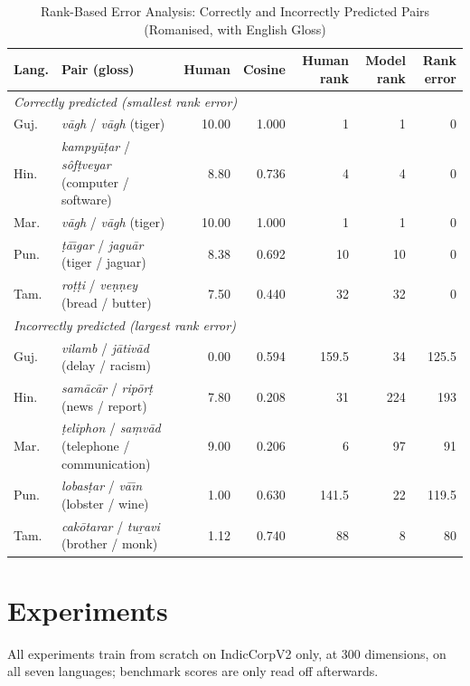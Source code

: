 \documentclass[conference,10pt]{IEEEtran}
\begin{document}
\begin{table}[!t]
\caption{Rank-Based Error Analysis: Correctly and Incorrectly Predicted Pairs (Romanised, with English Gloss)}
\label{tab:pairs}
\centering
\renewcommand{\arraystretch}{1.2}
\footnotesize
\begin{tabular}{|l|l|r|r|r|r|r|}
\hline
\rowcolor{srcblue!15}
\textbf{Lang.} & \textbf{Pair (gloss)} & \textbf{Human} & \textbf{Cosine} & \textbf{Human rank} & \textbf{Model rank} & \textbf{Rank error} \\
\hline
\multicolumn{7}{|l|}{\cellcolor{srcblue!6}\textit{Correctly predicted (smallest rank error)}} \\
\hline
Guj. & \textit{v\=agh} / \textit{v\=agh} (tiger) & 10.00 & 1.000 & 1 & 1 & 0 \\
\hline
Hin. & \textit{kampy\=u\d{t}ar} / \textit{s\^{o}f\d{t}veyar} (computer / software) & 8.80 & 0.736 & 4 & 4 & 0 \\
\hline
Mar. & \textit{v\=agh} / \textit{v\=agh} (tiger) & 10.00 & 1.000 & 1 & 1 & 0 \\
\hline
Pun. & \textit{\d{t}\=a\={\i}gar} / \textit{jagu\=ar} (tiger / jaguar) & 8.38 & 0.692 & 10 & 10 & 0 \\
\hline
Tam. & \textit{ro\d{t}\d{t}i} / \textit{ve\d{n}\d{n}ey} (bread / butter) & 7.50 & 0.440 & 32 & 32 & 0 \\
\hline
\multicolumn{7}{|l|}{\cellcolor{srcblue!6}\textit{Incorrectly predicted (largest rank error)}} \\
\hline
Guj. & \textit{vilamb} / \textit{j\=ativ\=ad} (delay / racism) & 0.00 & 0.594 & 159.5 & 34 & 125.5 \\
\hline
Hin. & \textit{sam\=ac\=ar} / \textit{rip\=or\d{t}} (news / report) & 7.80 & 0.208 & 31 & 224 & 193 \\
\hline
Mar. & \textit{\d{t}eliphon} / \textit{sa\d{m}v\=ad} (telephone / communication) & 9.00 & 0.206 & 6 & 97 & 91 \\
\hline
Pun. & \textit{lobas\d{t}ar} / \textit{v\=a\={\i}n} (lobster / wine) & 1.00 & 0.630 & 141.5 & 22 & 119.5 \\
\hline
Tam. & \textit{cak\=otarar} / \textit{tu\b{r}avi} (brother / monk) & 1.12 & 0.740 & 88 & 8 & 80 \\
\hline
\end{tabular}
\end{table}

\section{Experiments}\label{sec:experiments}
All experiments train from scratch on IndicCorpV2 only, at 300 dimensions, on all seven languages; benchmark scores are only read off afterwards.
\end{document}

